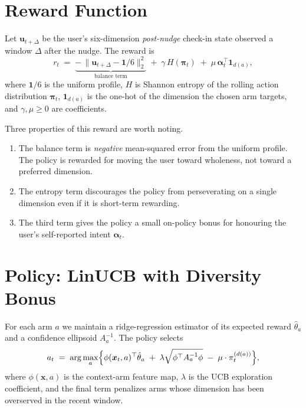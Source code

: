 \documentclass[11pt]{article}
\begin{document}
\section{Reward Function}

Let $\bm{u}_{t+\Delta}$ be the user's six-dimension
\emph{post-nudge} check-in state observed a window $\Delta$ after the
nudge. The reward is
\begin{equation}
\label{eq:reward}
r_t \;=\;
\underbrace{-\,\|\bm{u}_{t+\Delta} - \bm{1}/6\|_2^2}_{\text{balance term}}
 \;+\; \gamma\, H(\bm{\pi}_t) \;+\; \mu\, \bm{\alpha}_t^\top \bm{1}_{d(a)},
\end{equation}
where $\bm{1}/6$ is the uniform profile, $H$ is Shannon entropy of the
rolling action distribution $\bm{\pi}_t$, $\bm{1}_{d(a)}$ is the
one-hot of the dimension the chosen arm targets, and $\gamma, \mu \ge 0$
are coefficients.

Three properties of this reward are worth noting.

\begin{enumerate}
\item The balance term is \emph{negative} mean-squared error from the
      uniform profile. The policy is rewarded for moving the user
      toward wholeness, not toward a preferred dimension.
\item The entropy term discourages the policy from perseverating on a
      single dimension even if it is short-term rewarding.
\item The third term gives the policy a small on-policy bonus for
      honouring the user's self-reported intent $\bm{\alpha}_t$.
\end{enumerate}

\section{Policy: LinUCB with Diversity Bonus}

For each arm $a$ we maintain a ridge-regression estimator of its
expected reward $\hat\theta_a$ and a confidence ellipsoid $A_a^{-1}$.
The policy selects
\begin{equation}
\label{eq:linucb}
a_t \;=\; \arg\max_a
\Bigl\{
\phi(\bm{x}_t,a)^\top \hat\theta_a
 \;+\; \lambda \sqrt{\phi^\top A_a^{-1} \phi}
 \;-\; \mu \cdot \pi_t^{(d(a))}
\Bigr\},
\end{equation}
where $\phi(\bm{x},a)$ is the context-arm feature map, $\lambda$ is
the UCB exploration coefficient, and the final term penalizes arms
whose dimension has been overserved in the recent window.
\end{document}
